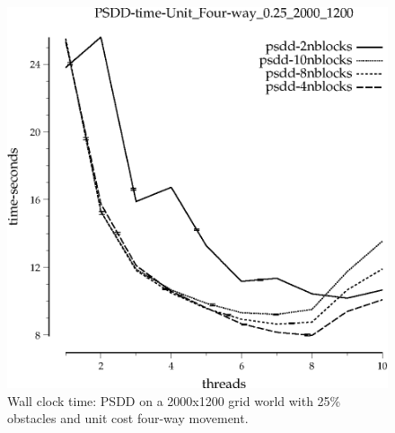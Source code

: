 \documentclass{article}
\begin{document}
\begin{figure}[t]
\begin{center}
\includegraphics{grid_unit_four-way_0.25_2000_1200/PSDD-time-Unit_Four-way_0.25_2000_1200.eps}
\caption{Wall clock time: PSDD on a 2000x1200 grid world with 25\%
  obstacles and unit cost four-way movement.}
\end{center}
\end{figure}
\end{document}
